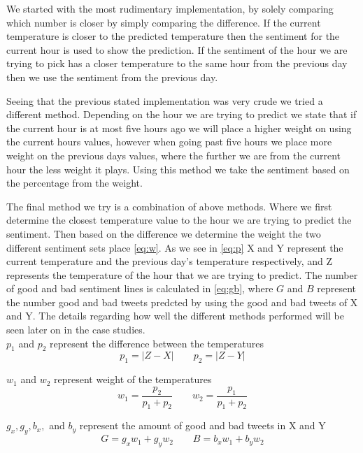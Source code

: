 \documentclass[journal]{vgtc}                %
\begin{document}
We started with the most rudimentary implementation, by solely comparing which number is closer by simply comparing the difference. If the current temperature is closer to the predicted temperature then the sentiment for the current hour is used to show the prediction. If the sentiment of the hour we are trying to pick has a closer temperature to the same hour from the previous day then we use the sentiment from the previous day. 

Seeing that the previous stated implementation was very crude we tried a different method. Depending on the hour we are trying to predict we state that if the current hour is at most five hours ago we will place a higher weight on using the current hours values, however when going past five hours we place more weight on the previous days values, where the further we are from the current hour the less weight it plays. Using this method we take the sentiment based on the percentage from the weight.

The final method we try is a combination of above methods. Where we first determine the closest temperature value to the hour we are trying to predict the sentiment. Then based on the difference we determine the weight the two different sentiment sets place \eqref{eq:w}. As we see in \eqref{eq:p} X and Y represent the current temperature and the previous day's temperature respectively, and Z represents the temperature of the hour that we are trying to predict. The number of good and bad sentiment lines is calculated in \eqref{eq:gb}, where $G$ and $B$ represent the number good and bad tweets predcted by using the good and bad tweets of X and Y. The details regarding how well the different methods performed will be seen later on in the case studies.\\

$p_1$ and $p_2$ represent the difference between the temperatures
\begin{equation} \label{eq:p} p_{1}=\left | Z-X \right |	\qquad p_{2}=\left | Z-Y \right |	 \end{equation}

$w_1$ and $w_2$ represent weight of the temperatures
\begin{equation} \label{eq:w} w_{1}=\frac{p_{2}}{p_{1}+p_{2}} 	\qquad w_{2}=\frac{p_{1}}{p_{1}+p_{2}}   \end{equation}

$g_x, g_y, b_x,$ and $b_y$ represent the amount of good and bad tweets in X and Y
\begin{equation} \label{eq:gb}  G = g_{x}w_{1} + g_{y}w_{2}	\qquad B = b_{x}w_{1} + b_{y}w_{2}	 \end{equation}
\end{document}
